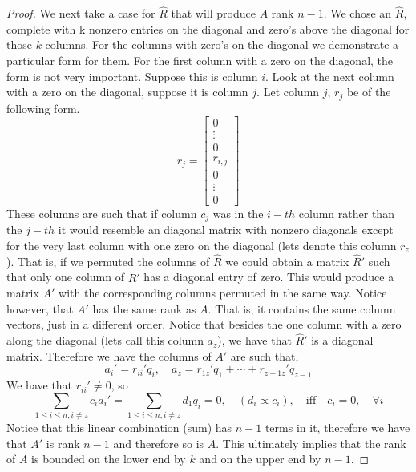 \documentclass{article}
\begin{document}
\begin{enumerate}
\begin{enumerate}
\begin{proof}
    We next take a case for $\hat{R}$ that will produce $A$ rank $n-1$. We chose an $\hat{R}$, complete with k nonzero entries on the diagonal and zero's above the diagonal for those $k$ columns. For the columns with zero's on the diagonal we demonstrate a particular form for them. For the first column with a zero on the diagonal, the form is not very important. Suppose this is column $i$. Look at the next column with a zero on the diagonal, suppose it is column $j$.  Let column $j$, $r_j$ be of the following form.
    \[
        r_j = \left[\begin{array}{c}
                    0 \\
                    \vdots  \\
                    0 \\
                    r_{i, j} \\
                    0 \\
                    \vdots \\
                    0 
                    \end{array}\right]
    \] 
    These columns are such that if column $c_j$ was in the $i-th$ column rather than the $j-th$ it would resemble an diagonal matrix with nonzero diagonals except for the very last column with one zero on the diagonal (lets denote this column $r_z$). That is, if we permuted the columns of $\hat{R}$ we could obtain a matrix $\hat{R}'$ such that only one column of $\hat{R}'$ has a diagonal entry of zero.  This would produce a matrix $A'$ with the corresponding columns permuted in the same way. Notice however, that $A'$ has the same rank as $A$. That is, it contains the same column vectors, just in a different order. Notice that besides the one column with a zero along the diagonal (lets call this column $a_z$), we have that $\hat{R}'$ is a diagonal matrix. Therefore we have the columns of $A'$ are such that, 
    \[
        a_i' = r_{ii}'q_i, \quad  a_z = r_{1z}'q_1 + \cdots + r_{z-1z}'q_{z-1}
    \]
    We have that $r_{ii}' \neq 0$, so 
    \[
        \sum_{1 \le i \le n, i \neq z} c_ia_i' = \sum_{1 \le i \le n, i \neq z} d_1q_i = 0, \quad (d_i \propto c_i), \quad \text{iff}  \quad c_i = 0, \quad  \forall i
    \]
    Notice that this linear combination (sum) has $n-1$ terms in it, therefore we have that $A'$ is rank $n-1$ and therefore so is $A$. This ultimately implies that the rank of $A$ is bounded on the lower end by $k$ and on the upper end by $n-1$. 
    \end{proof}
\end{enumerate}



\end{enumerate}
\end{document}
